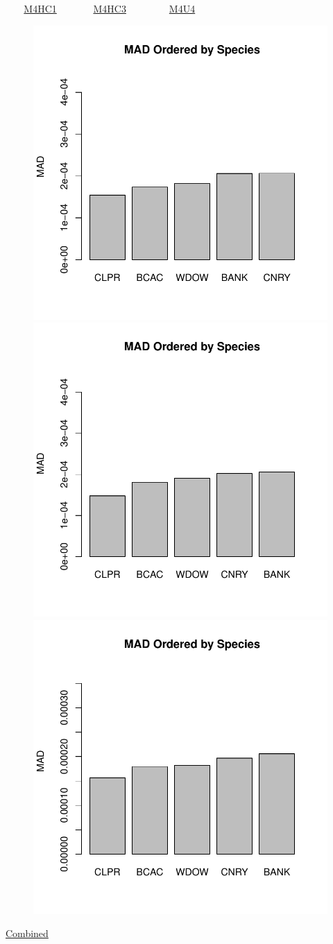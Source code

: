 \documentclass[ xcolor = pdftex, dvipsnames, table ]{beamer}
\begin{document}
\begin{frame}{$~~~~~~~$ \href{https://github.com/gasduster99/sppComp/tree/master/sscRuns/25319781982M4HC1}{M4HC1} $~~~~~~~~~~~~~~$ \href{https://github.com/gasduster99/sppComp/tree/master/sscRuns/25319781982M4HC3}{M4HC3} $~~~~~~~~~~~~~~~~~$ \href{https://github.com/gasduster99/sppComp/tree/master/sscRuns/25319781982M4U4}{M4U4} }
        \begin{figure}[ht!]
        \centering
        \hspace*{-1cm}
        \includegraphics[width=.4\textwidth]{../sscRuns/25319781982M4HC1/sppHeadMad68.pdf}
        \includegraphics[width=.4\textwidth]{../sscRuns/25319781982M4HC3/sppHeadMad68.pdf}
        \includegraphics[width=.4\textwidth]{../sscRuns/25319781982M4U4/sppHeadMad68.pdf}
        \end{figure}
	\vspace{-1cm}
	\begin{center}
	\Large
	\href{https://github.com/gasduster99/sppComp/tree/master/try1/postSSC/25319781982M4HC1HC3U4}{Combined}
	\end{center}
\end{frame}
\end{document}
